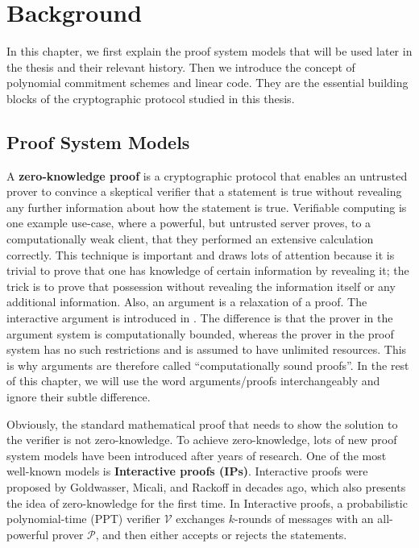 \chapter{Background}

In this chapter, we first explain the proof system models that will be used later in the thesis and their relevant history. Then we introduce the concept of polynomial commitment schemes and linear code. They are the essential building blocks of the cryptographic protocol studied in this thesis.

\section{Proof System Models}

A \textbf{zero-knowledge proof} is a cryptographic protocol that enables an untrusted prover to convince a skeptical verifier that a statement is true without revealing any further information about how the statement is true. 
Verifiable computing is one example use-case, where a powerful, but untrusted server proves, to a computationally weak client, that they performed an extensive calculation correctly.
This technique is important and draws lots of attention because it is trivial to prove that one has knowledge of certain information by revealing it; the trick is to prove that possession without revealing the information itself or any additional information. 
Also, an argument is a relaxation of a proof. The interactive argument is introduced in \cite{10.1145/22145.22178}.
The difference is that the prover in the argument system is computationally bounded, whereas the prover in the proof system has no such restrictions and is assumed to have unlimited resources. This is why arguments are therefore called ``computationally sound proofs''. In the rest of this chapter, we will use the word arguments/proofs interchangeably and ignore their subtle difference.



Obviously, the standard mathematical proof that needs to show the solution to the verifier is not zero-knowledge.
To achieve zero-knowledge, lots of new proof system models have been introduced after years of research. One of the most well-known models is \textbf{Interactive proofs (IPs)}. Interactive proofs were proposed by Goldwasser, Micali, and Rackoff in \cite{DBLP:books/acm/19/GoldwasserMR19} decades ago, which also presents the idea of zero-knowledge for the first time. In Interactive proofs, a probabilistic polynomial-time (PPT) verifier $\mathcal{V}$ exchanges $k$-rounds of messages with an all-powerful prover $\mathcal{P}$, and then either accepts or rejects the statements.

